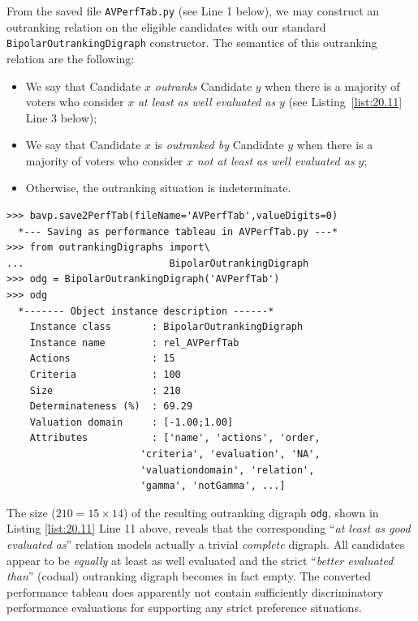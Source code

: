 From the saved file \texttt{AVPerfTab.py} (see Line 1 below), we may construct an outranking relation on the eligible candidates with our standard \texttt{BipolarOutrankingDigraph} constructor. The semantics of this outranking relation are the following:
\begin{itemize}[nosep,leftmargin=0.5cm,rightmargin=0.5cm]
\item We say that Candidate $x$ \emph{outranks} Candidate $y$ when there is a majority of voters who consider $x$ \emph{at least as well evaluated as} $y$ (see Listing~\ref{list:20.11} Line 3 below);
\item We say that Candidate $x$ is \emph{outranked by} Candidate $y$ when there is a majority of voters who consider $x$ \emph{not at least as well evaluated as} $y$;
\item Otherwise, the outranking situation is indeterminate.
\end{itemize}
\begin{lstlisting}[caption={Computing the outranking digraph},label=list:20.11]
>>> bavp.save2PerfTab(fileName='AVPerfTab',valueDigits=0)
  *--- Saving as performance tableau in AVPerfTab.py ---*
>>> from outrankingDigraphs import\
...                         BipolarOutrankingDigraph
>>> odg = BipolarOutrankingDigraph('AVPerfTab')
>>> odg
  *------- Object instance description ------*
    Instance class       : BipolarOutrankingDigraph
    Instance name        : rel_AVPerfTab
    Actions              : 15
    Criteria             : 100
    Size                 : 210
    Determinateness (%)  : 69.29
    Valuation domain     : [-1.00;1.00]
    Attributes           : ['name', 'actions', 'order,
                       'criteria', 'evaluation', 'NA',
                       'valuationdomain', 'relation',
                       'gamma', 'notGamma', ...]
\end{lstlisting}
The size ($210 = 15 \times 14$) of the resulting outranking digraph \texttt{odg}, shown in Listing \ref{list:20.11} Line 11 above, reveals that the corresponding ``\emph{at least as good evaluated as}'' relation models actually a trivial \emph{complete} digraph. All candidates appear to be \emph{equally} at least as well evaluated and the strict ``\emph{better evaluated than}'' (codual) outranking digraph becomes in fact empty. The converted performance tableau does apparently not contain sufficiently discriminatory performance evaluations for supporting any strict preference situations.

